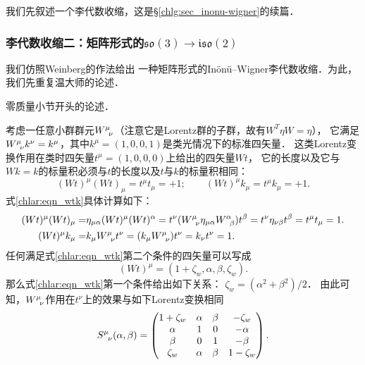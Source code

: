 我们先叙述一个李代数收缩，这是\S\ref{chlg:sec_inonu-wigner}的续篇．




\subsubsection{李代数收缩二：矩阵形式的$\mathfrak{so}(3)\to \mathfrak{iso}(2)$}\label{chlar:sec_so2iso}

我们\cite{liu_ge-2014}仿照Weinberg的作法给出
一种矩阵形式的In\"on\"u--Wigner李代数收缩．为此，我们先重复温大师的论述．

\begin{example}\label{chlar:exam_weinberg-zero}
	\textcite[\S 2.5]{weinberg_vol1}零质量小节开头的论述．
\end{example}
考虑一任意小群群元$W^\mu_{\hphantom{\mu}\nu}$（注意它是Lorentz群的子群，故有$W^T \eta W = \eta$），
它满足$W^\mu_{\hphantom{\mu}\nu} k^\nu=k^\mu$，其中$k^\mu=(1,0,0,1)$是类光情况下的标准四矢量．
这类Lorentz变换作用在类时四矢量$t^\mu=(1,0,0,0)$上给出的四矢量$Wt$，
它的长度以及它与$W k=k$的标量积必须与$t$的长度以及$t$与$k$的标量积相同：
\begin{equation}\label{chlar:eqn_wtk}
	(W t)^\mu(W t)_\mu=t^\mu t_\mu=+1; \qquad
	(W t)^\mu k_\mu=t^\mu k_\mu=+1 .
\end{equation}
式\eqref{chlar:eqn_wtk}具体计算如下：
\begin{align*}
	(W t)^\mu(W t)_\mu=& \eta_{\mu\alpha} (W t)^\mu (W t)^\alpha
	= t^\nu( W^\mu_{\hphantom{\mu}\nu}  \eta_{\mu\alpha} W^\alpha_{\hphantom{\mu}\beta}) t^\beta
	= t^\nu \eta_{\nu\beta} t^\beta = t^\mu t_\mu=1. \\
	(W t)^\mu k_\mu=& k_\mu W^\mu_{\hphantom{\mu}\nu} t^\nu
	=(k_\mu W^\mu_{\hphantom{\mu}\nu}) t^\nu = k_\nu t^\nu = 1.
\end{align*}
任何满足式\eqref{chlar:eqn_wtk}第二个条件的四矢量可以写成
\begin{equation*}
	(W t)^\mu=(1+\zeta_w, \alpha, \beta, \zeta_w ) .
\end{equation*}
那么式\eqref{chlar:eqn_wtk}第一个条件给出如下关系：
$	\zeta_w=\left(\alpha^2+\beta^2\right) / 2 $．
由此可知，$W^\mu_{\hphantom{\mu}\nu}$作用在$t^\nu$上的效果与如下Lorentz变换相同
\begin{align}
	S^\mu_{\hphantom{\mu}\nu}(\alpha, \beta)=
	\begin{pmatrix}
		{1 + \zeta_w } &\alpha&\beta&{ - \zeta_w } \\
		{\alpha }&1&0&{ - \alpha } \\
		{\beta }& 0&1&{ - \beta } \\
		{\zeta_w }& \alpha&\beta&{1 - \zeta_w }
	\end{pmatrix} . \label{chlar:eqn_Sab-W}
\end{align}
